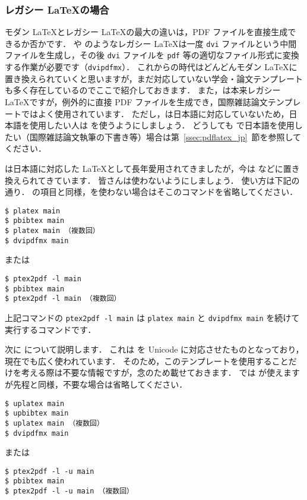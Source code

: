\subsubsection*{レガシー \LaTeX の場合}

モダン \LaTeX とレガシー \LaTeX の最大の違いは，PDF ファイルを直接生成できるか否かです．
\pLaTeX や \upLaTeX のようなレガシー \LaTeX は一度 \verb|dvi| ファイルという中間ファイルを生成し，その後 \verb|dvi| ファイルを \verb|pdf| 等の適切なファイル形式に変換する作業が必要です（\verb|dvipdfmx|）．
これからの時代はどんどんモダン \LaTeX に置き換えられていくと思いますが，まだ対応していない学会・論文テンプレートも多く存在しているのでここで紹介しておきます．
また，\pdfLaTeX は本来レガシー \LaTeX ですが，例外的に直接 PDF ファイルを生成でき，国際雑誌論文テンプレートではよく使用されています．
ただし，\pdfLaTeX は日本語に対応していないため，日本語を使用したい人は \LuaLaTeX を使うようにしましょう．
どうしても \pdfLaTeX で日本語を使用したい（国際雑誌論文執筆の下書き等）場合は第~\ref{ssec:pdflatex_jp}~節を参照してください．

\pLaTeX は日本語に対応した \LaTeX として長年愛用されてきましたが，今は \LuaLaTeX などに置き換えられてきています．
皆さんは使わないようにしましょう．
使い方は下記の通り．
\LuaLaTeX の項目と同様，\BibTeX を使わない場合はそこのコマンドを省略してください．

\begin{tcolorbox}[title={\pLaTeX$+$\pBibTeX}]
\begin{verbatim}
$ platex main
$ pbibtex main
$ platex main （複数回）
$ dvipdfmx main
\end{verbatim}
または
\begin{verbatim}
$ ptex2pdf -l main
$ pbibtex main
$ ptex2pdf -l main （複数回）
\end{verbatim}
\end{tcolorbox}

上記コマンドの \verb|ptex2pdf -l main| は \verb|platex main| と \verb|dvipdfmx main| を続けて実行するコマンドです．

次に \upLaTeX について説明します．
これは \pLaTeX を Unicode に対応させたものとなっており，現在でも広く使われています．
そのため，このテンプレートを使用することだけを考える際は不要な情報ですが，念のため載せておきます．
\upLaTeX では \upBibTeX が使えますが先程と同様，不要な場合は省略してください．

\begin{tcolorbox}[title={\upLaTeX$+$\upBibTeX}]
\begin{verbatim}
$ uplatex main
$ upbibtex main
$ uplatex main （複数回）
$ dvipdfmx main
\end{verbatim}
または
\begin{verbatim}
$ ptex2pdf -l -u main
$ pbibtex main
$ ptex2pdf -l -u main （複数回）
\end{verbatim}
\end{tcolorbox}

